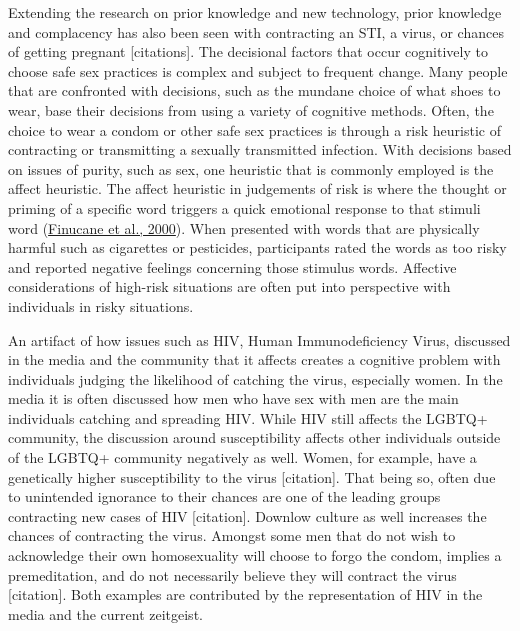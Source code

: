 \documentclass[
  donotrepeattitle,doc, 12pt, a4paper,floatsintext]{apa7}
\begin{document}
Extending the research on prior knowledge and new technology, prior knowledge and complacency has also been seen with contracting an STI, a virus, or chances of getting pregnant {[}citations{]}. The decisional factors that occur cognitively to choose safe sex practices is complex and subject to frequent change. Many people that are confronted with decisions, such as the mundane choice of what shoes to wear, base their decisions from using a variety of cognitive methods. Often, the choice to wear a condom or other safe sex practices is through a risk heuristic of contracting or transmitting a sexually transmitted infection. With decisions based on issues of purity, such as sex, one heuristic that is commonly employed is the affect heuristic. The affect heuristic in judgements of risk is where the thought or priming of a specific word triggers a quick emotional response to that stimuli word (\protect\hyperlink{ref-finucane2000}{Finucane et al., 2000}). When presented with words that are physically harmful such as cigarettes or pesticides, participants rated the words as too risky and reported negative feelings concerning those stimulus words. Affective considerations of high-risk situations are often put into perspective with individuals in risky situations.

An artifact of how issues such as HIV, Human Immunodeficiency Virus, discussed in the media and the community that it affects creates a cognitive problem with individuals judging the likelihood of catching the virus, especially women. In the media it is often discussed how men who have sex with men are the main individuals catching and spreading HIV. While HIV still affects the LGBTQ+ community, the discussion around susceptibility affects other individuals outside of the LGBTQ+ community negatively as well. Women, for example, have a genetically higher susceptibility to the virus {[}citation{]}. That being so, often due to unintended ignorance to their chances are one of the leading groups contracting new cases of HIV {[}citation{]}. Downlow culture as well increases the chances of contracting the virus. Amongst some men that do not wish to acknowledge their own homosexuality will choose to forgo the condom, implies a premeditation, and do not necessarily believe they will contract the virus {[}citation{]}. Both examples are contributed by the representation of HIV in the media and the current zeitgeist.
\end{document}
